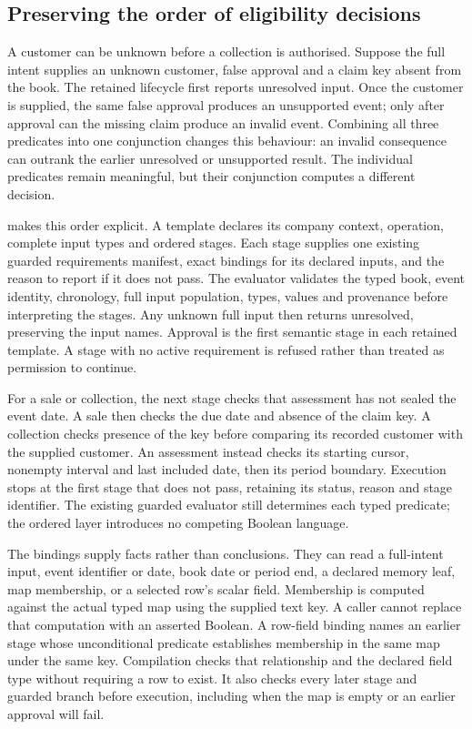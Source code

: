 \subsection{Preserving the order of eligibility decisions}
\label{sec:ordered-event-eligibility}

A customer can be unknown before a collection is authorised. Suppose the full
intent supplies an unknown customer, false approval and a claim key absent
from the book. The retained lifecycle first reports unresolved input. Once the
customer is supplied, the same false approval produces an unsupported event;
only after approval can the missing claim produce an invalid event. Combining
all three predicates into one conjunction changes this behaviour: an invalid
consequence can outrank the earlier unresolved or unsupported result. The
individual predicates remain meaningful, but their conjunction computes a
different decision.

 makes this order explicit. A template declares
its company context, operation, complete input types and ordered stages. Each
stage supplies one existing guarded requirements manifest, exact bindings for
its declared inputs, and the reason to report if it does not pass. The evaluator
validates the typed book, event identity, chronology, full input population,
types, values and provenance before interpreting the stages. Any unknown full
input then returns unresolved, preserving the input names. Approval is the
first semantic stage in each retained template. A stage with no active
requirement is refused rather than treated as permission to continue.

For a sale or collection, the next stage checks that assessment has not sealed
the event date. A sale then checks the due date and absence of the claim key.
A collection checks presence of the key before comparing its recorded customer
with the supplied customer. An assessment instead checks its starting cursor,
nonempty interval and last included date, then its period boundary. Execution
stops at the first stage that does not pass, retaining its status, reason and
stage identifier. The existing guarded evaluator still determines each typed
predicate; the ordered layer introduces no competing Boolean language.

The bindings supply facts rather than conclusions. They can read a full-intent
input, event identifier or date, book date or period end, a declared memory
leaf, map membership, or a selected row's scalar field. Membership is computed
against the actual typed map using the supplied text key. A caller cannot
replace that computation with an asserted Boolean. A row-field binding names
an earlier stage whose unconditional predicate establishes membership in the
same map under the same key. Compilation checks that relationship and the
declared field type without requiring a row to exist. It also checks every
later stage and guarded branch before execution, including when the map is
empty or an earlier approval will fail.

